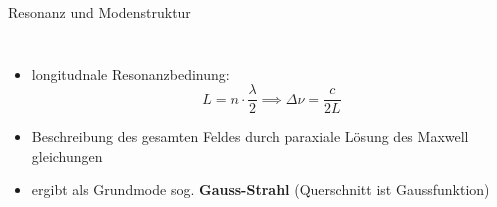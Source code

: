 \documentclass[10pt, aspectratio=169]{beamer}
\begin{document}
\begin{frame}{Resonanz und Modenstruktur}
  \begin{columns}
      
    \begin{itemize}
    \item<1-> longitudnale Resonanzbedinung:
      \begin{equation}
        \label{eq:longmodes}
        L=n\cdot\frac{\lambda}{2} \implies \Delta\nu = \frac{c}{2L}
      \end{equation}
    \item<2-> Beschreibung des gesamten Feldes durch paraxiale
      L\"osung des Maxwell gleichungen 
    \item<3-> ergibt als Grundmode sog. \textbf{Gauss-Strahl}
      (Querschnitt ist Gaussfunktion) 
    \end{itemize}
  \end{columns}
\end{frame}
\end{document}
